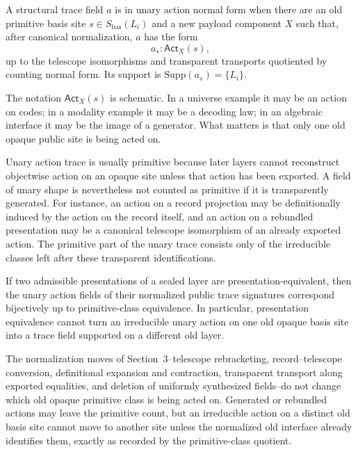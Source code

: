 \documentclass{lmcs}
\begin{document}
\begin{defi}
A structural trace field \(a\) is in unary action normal form when there are an old primitive
basis site \(s\in S_{\mathrm{bas}}(L_i)\) and a new payload component \(X\) such that, after
canonical normalization, \(a\) has the form
\[
  a_s : \mathsf{Act}_X(s),
\]
up to the telescope isomorphisms and transparent transports quotiented by counting normal
form.  Its support is \(\mathrm{Supp}(a_s)=\{L_i\}\).
\end{defi}

The notation \(\mathsf{Act}_X(s)\) is schematic.  In a universe example it may be an action
on codes; in a modality example it may be a decoding law; in an algebraic interface it may
be the image of a generator.  What matters is that only one old opaque public site is being
acted on.

Unary action trace is usually primitive because later layers cannot reconstruct objectwise
action on an opaque site unless that action has been exported.  A field of unary shape is
nevertheless not counted as primitive if it is transparently generated.  For instance, an
action on a record projection may be definitionally induced by the action on the record
itself, and an action on a rebundled presentation may be a canonical telescope isomorphism
of an already exported action.  The primitive part of the unary trace consists only of the
irreducible classes left after these transparent identifications.

\begin{lem}
If two admissible presentations of a sealed layer are presentation-equivalent, then the unary
action fields of their normalized public trace signatures correspond bijectively up to
primitive-class equivalence.  In particular, presentation equivalence cannot turn an
irreducible unary action on one old opaque basis site into a trace field supported on a
different old layer.
\end{lem}

The normalization moves of Section~3--telescope rebracketing, record--telescope conversion,
definitional expansion and contraction, transparent transport along exported equalities, and
deletion of uniformly synthesized fields--do not change which old opaque primitive class is
being acted on.  Generated or rebundled actions may leave the primitive count, but an
irreducible action on a distinct old basis site cannot move to another site unless the
normalized old interface already identifies them, exactly as recorded by the primitive-class
quotient.
\end{document}
